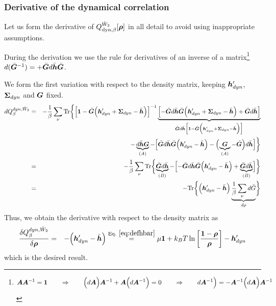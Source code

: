 \documentclass[11pt,a4paper]{report}
\begin{document}
\subsubsection{Derivative of the dynamical correlation}
Let us form the derivative of
$Q_{\text{dyn},\beta}^{\hat{W}_2}[\bm{\rho}]$ in all detail to avoid
using inappropriate assumptions.


During the derivation we use the rule for derivatives of an inverse of
a matrix\footnote{\begin{eqnarray} 
\bm{A}\bm{A}^{-1}=\bm{1}
\qquad\Rightarrow\qquad
\Bigl(d\bm{A}\Bigr)\bm{A}^{-1}
+\bm{A}\Bigl(d\bm{A}^{-1}\Bigr)=0
\qquad\Rightarrow\qquad
d\bm{A}^{-1}\Bigr)=-\bm{A}^{-1}\Bigl(d\bm{A}\Bigr)\bm{A}^{-1}
\end{eqnarray}
}
$d(\bar{\bm{G}}^{-1})=+\bar{\bm{G}}d\bar{\bm{h}}\bar{\bm{G}}$.

We form the first variation with respect to the density matrix,
keeping $\bm{h}'_{dyn}$, $\bm{\Sigma}_{dyn}$ and $\bm{G}$ fixed.
\begin{eqnarray}
d Q_{\beta}^{dyn,\hat{W}_2}
&=&
-\frac{1}{\beta}\sum_\nu\mathrm{Tr}\biggl\lbrace
\Bigl[\bm{1}-\bar{\bm{G}}
\Bigl(\bm{h}'_{dyn}+\bm{\Sigma}_{dyn}-\bar{\bm{h}}\Bigr)\Bigr]^{-1}
\underbrace{
\Bigl[-\bar{\bm{G}}d\bar{\bm{h}}\bar{\bm{G}}
\Bigl(\bm{h}'_{dyn}+\bm{\Sigma}_{dyn}-\bar{\bm{h}}\Bigr)
+\bar{\bm{G}}d\bar{\bm{h}}\Bigr]}
_{\bar{\bm{G}}d\bar{\bm{h}}\Bigl[\bm{1}-\bar{\bm{G}}
\Bigl(\bm{h}'_{dyn}+\bm{\Sigma}_{dyn}-\bar{\bm{h}}\Bigr)
\Bigr]}
\nonumber\\
&&-\underbrace{d\bar{\bm{h}}\bm{G}}_{(A)}-
\Bigl[\bar{\bm{G}}d\bar{\bm{h}}\bar{\bm{G}}
\Bigl(\bm{h}'_{dyn}-\bar{\bm{h}}\Bigr)
-\Bigl(\underbrace{\bm{G}}_{(A)}-\bar{\bm{G}}\Bigr)d\bar{\bm{h}}\Bigr]
\biggr\rbrace
\nonumber\\
&=&
-\frac{1}{\beta}\sum_\nu\mathrm{Tr}\biggl\lbrace
\underbrace{\bar{\bm{G}}d\bar{\bm{h}}}_{(B)}
-
\Bigl[-\bar{\bm{G}}d\bar{\bm{h}}\bar{\bm{G}}
\Bigl(\bm{h}'_{dyn}-\bar{\bm{h}}\Bigr)
+\underbrace{\bar{\bm{G}}d\bar{\bm{h}}}_{(B)}\Bigr]
\biggr\rbrace
\nonumber\\
&=&-\mathrm{Tr}\biggl\lbrace\Bigl(\bm{h}'_{dyn}-\bar{\bm{h}}\Bigr)
\underbrace{\frac{1}{\beta}\sum_\nu d\bar{G}}_{d\rho}
\biggr\rbrace
\end{eqnarray}
Thus, we obtain the derivative with respect to the density matrix as
\begin{eqnarray}
\frac{\delta Q_{\beta}^{dyn,\hat{W}_2}}{\delta\mat{\rho}}
&=&
-\Bigl(\mat{h}'_{dyn}-\bar{\mat{h}}\Bigr)
\eqrel{eq:defhbar}{=}
\mu\mat{1}+k_BT\ln\left[\frac{\mat{1}-\mat{\rho}}{\mat{\rho}}\right]
-\mat{h}'_{dyn}
\end{eqnarray}
which is the desired result.
\end{document}
